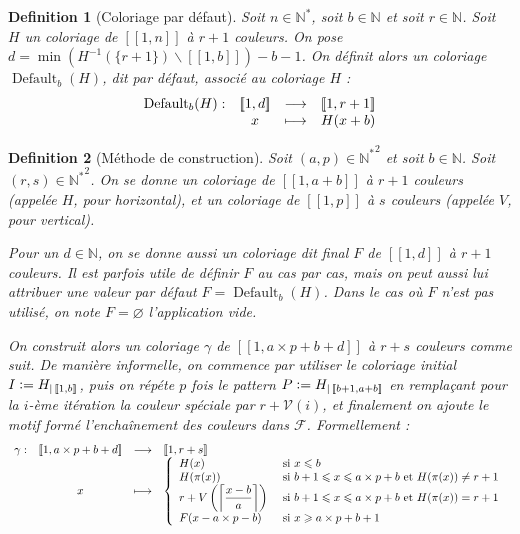 \documentclass{article}
\newtheorem{definition}{Definition}[section]
\DeclareMathOperator{\coldef}{Default}
\newcommand{\defeq}{\vcentcolon=}
\begin{document}
\begin{definition}[Coloriage par défaut]
Soit \(n \in \mathbb{N}^*\), soit \(b \in \mathbb{N}\) et soit \(r \in \mathbb{N}\). Soit \(H\) un coloriage de \([\![1, n]\!]\) à \(r +1\) couleurs. On pose \(d = \min \left(H^{-1}(\{r + 1\}) \backslash [\![1, b]\!] \right) - b  - 1\). On définit alors un coloriage \(\coldef_b(H)\), dit par défaut, associé au coloriage \(H\) :
\[\begin{array}{c c c c}
	\coldef_b(H) : & [\![1, d]\!] & \longrightarrow & [\![1, r + 1]\!] \\
	 & x & \longmapsto & H(x + b)
\end{array}\]
\end{definition}

\begin{definition}[Méthode de construction]
Soit \((a, p) \in {\mathbb{N}^*}^2\) et soit \(b \in \mathbb{N}\). Soit \((r, s) \in {\mathbb{N}^*}^2\). On se donne un coloriage de \([\![1, a + b]\!]\) à \(r + 1\) couleurs (appelée \(H\), pour horizontal), et un coloriage de \([\![1, p]\!]\) à \(s\) couleurs (appelée \(V\), pour vertical).

Pour un \(d \in \mathbb{N}\), on se donne aussi un coloriage dit final \(F\) de \([\![1, d]\!]\) à \(r + 1\) couleurs. Il est parfois utile de définir \(F\) au cas par cas, mais on peut aussi lui attribuer une valeur par défaut \(F = \coldef_b(H)\). Dans le cas où \(F\) n'est pas utilisé, on note \(F = \varnothing\) l'application vide. 

On construit alors un coloriage \(\gamma\) de \([\![1, a \times p + b + d]\!]\) à \(r + s\) couleurs comme suit. De manière informelle, on commence par utiliser le coloriage initial \(I \defeq H_{| \, [\![1, b]\!]}\), puis on répéte \(p\) fois le pattern \(P \defeq H_{| \, [\![b + 1, a + b]\!]}\) en remplaçant pour la \(i\)-ème itération la couleur spéciale par \(r + \mathcal{V}(i)\), et finalement on ajoute le motif formé l'enchaînement des couleurs dans \(\mathcal{F}\). Formellement :
\[\begin{array}{c c c l}
	\gamma: & [\![1, a \times p + b + d]\!]  & \longrightarrow &  [\![1, r + s]\!] \\
 	& x & \longmapsto & 
		\left\{\begin{array}{l l}
			H(x) & ~\text{si}~ x \leqslant b \\
			H(\pi(x)) & ~\text{si}~  b + 1 \leqslant x \leqslant a \times p + b ~\text{et}~ H(\pi(x)) \neq r + 1 \\
			r + V \left(\left\lceil \dfrac{x - b}{a} \right\rceil\right) & ~\text{si}~ b + 1 \leqslant x \leqslant a \times p + b ~\text{et}~ H(\pi(x)) = r + 1 \\
			F(x - a \times p - b) & ~\text{si}~ x \geqslant a \times p + b + 1
		\end{array}\right.
\end{array}\]
\end{definition}
\end{document}
